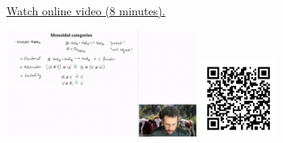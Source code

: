 
\begin{minipage}{10cm}
    \href{https://act4e-spring21.netlify.app/spring2021-par-feedback:mon-cat:mon-cat-def.html}{Watch online video (8 minutes).}
        
    \href{https://act4e-spring21.netlify.app/spring2021-par-feedback:mon-cat:mon-cat-def.html}{\includegraphics[height=3.5cm]{spring2021-par-feedback:mon-cat:mon-cat-def/thumbnails.jpg}}
    \href{https://act4e-spring21.netlify.app/spring2021-par-feedback:mon-cat:mon-cat-def.html}{\includegraphics[height=2.5cm]{spring2021-par-feedback:mon-cat:mon-cat-def/qrcode.png}}
\end{minipage}
